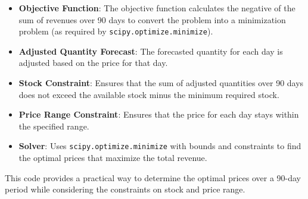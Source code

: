 \documentclass{article}
\begin{document}
\begin{itemize}
    \item \textbf{Objective Function}: The objective function calculates the negative of the sum of revenues over 90 days to convert the problem into a minimization problem (as required by \texttt{scipy.optimize.minimize}).
    \item \textbf{Adjusted Quantity Forecast}: The forecasted quantity for each day is adjusted based on the price for that day.
    \item \textbf{Stock Constraint}: Ensures that the sum of adjusted quantities over 90 days does not exceed the available stock minus the minimum required stock.
    \item \textbf{Price Range Constraint}: Ensures that the price for each day stays within the specified range.
    \item \textbf{Solver}: Uses \texttt{scipy.optimize.minimize} with bounds and constraints to find the optimal prices that maximize the total revenue.
\end{itemize}

This code provides a practical way to determine the optimal prices over a 90-day period while considering the constraints on stock and price range.
\end{document}
